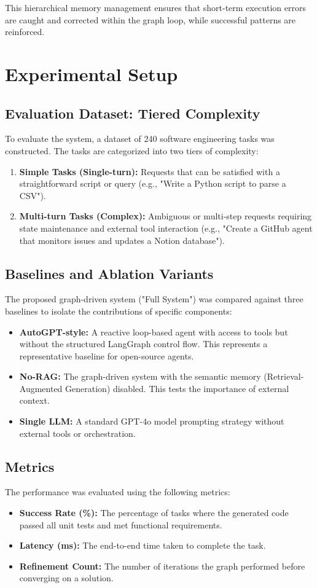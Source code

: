 \documentclass[lettersize,journal]{IEEEtran}
\begin{document}
This hierarchical memory management ensures that short-term execution errors are caught and corrected within the graph loop, while successful patterns are reinforced.

\section{Experimental Setup}

\subsection{Evaluation Dataset: Tiered Complexity}
To evaluate the system, a dataset of 240 software engineering tasks was constructed. The tasks are categorized into two tiers of complexity:
\begin{enumerate}
    \item \textbf{Simple Tasks (Single-turn):} Requests that can be satisfied with a straightforward script or query (e.g., "Write a Python script to parse a CSV").
    \item \textbf{Multi-turn Tasks (Complex):} Ambiguous or multi-step requests requiring state maintenance and external tool interaction (e.g., "Create a GitHub agent that monitors issues and updates a Notion database").
\end{enumerate}

\subsection{Baselines and Ablation Variants}
The proposed graph-driven system ("Full System") was compared against three baselines to isolate the contributions of specific components:
\begin{itemize}
    \item \textbf{AutoGPT-style:} A reactive loop-based agent with access to tools but without the structured LangGraph control flow. This represents a representative baseline for open-source agents.
    \item \textbf{No-RAG:} The graph-driven system with the semantic memory (Retrieval-Augmented Generation) disabled. This tests the importance of external context.
    \item \textbf{Single LLM:} A standard GPT-4o model prompting strategy without external tools or orchestration.
\end{itemize}

\subsection{Metrics}
The performance was evaluated using the following metrics:
\begin{itemize}
    \item \textbf{Success Rate (\%):} The percentage of tasks where the generated code passed all unit tests and met functional requirements.
    \item \textbf{Latency (ms):} The end-to-end time taken to complete the task.
    \item \textbf{Refinement Count:} The number of iterations the graph performed before converging on a solution.
\end{itemize}
\end{document}
